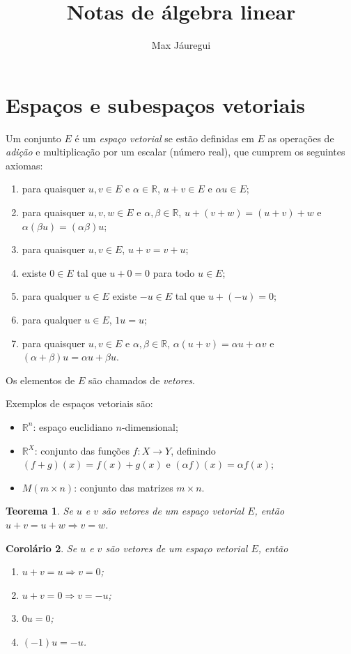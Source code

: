 \documentclass[12pt,a4paper]{article}
\title{Notas de álgebra linear}
\author{Max Jáuregui}
\newcommand{\R}{\mathbb{R}}
\newtheorem{thm}{Teorema}[section]
\newtheorem{cor}[thm]{Corolário}
\theoremstyle{definition}
\begin{document}
\maketitle

\tableofcontents

\section{Espaços e subespaços vetoriais}
Um conjunto $E$ é um \textit{espaço vetorial} se estão definidas em
$E$ as operações de \textit{adição} e multiplicação por um escalar
(número real), que cumprem os seguintes axiomas:
\begin{enumerate}
\item para quaisquer $u,v\in E$ e $\alpha\in\R$, $u+v\in E$ e
  $\alpha u\in E$;
\item para quaisquer $u,v,w\in E$ e $\alpha,\beta\in\R$,
  $u+(v+w)=(u+v)+w$ e $\alpha(\beta u)=(\alpha \beta)u$;
\item para quaisquer $u,v\in E$, $u+v=v+u$;
\item existe $0\in E$ tal que $u+0=0$ para todo $u\in E$;
\item para qualquer $u\in E$ existe $-u\in E$ tal que $u+(-u)=0$;
\item para qualquer $u\in E$, $1u=u$;
\item para quaisquer $u,v\in E$ e $\alpha,\beta\in\R$,
  $\alpha(u+v)=\alpha u+\alpha v$ e
  $(\alpha+\beta)u=\alpha u+\beta u$.
\end{enumerate}
Os elementos de $E$ são chamados de \textit{vetores}.

Exemplos de espaços vetoriais são:
\begin{itemize}
\item $\R^n$: espaço euclidiano $n$-dimensional;
\item $\R^X$: conjunto das funções $f:X\to Y$, definindo
  $(f+g)(x)=f(x)+g(x)$ e $(\alpha f)(x)=\alpha f(x)$;
\item $M(m\times n)$: conjunto das matrizes $m\times n$.
\end{itemize}

\begin{thm}
  Se $u$ e $v$ são vetores de um espaço vetorial $E$, então
  $u+v=u+w\Rightarrow v=w$.
\end{thm}
\begin{cor}
  Se $u$ e $v$ são vetores de um espaço vetorial $E$, então
  \begin{enumerate}
  \item $u+v=u\Rightarrow v=0$;
  \item $u+v=0\Rightarrow v=-u$;
  \item $0u=0$;
  \item $(-1)u=-u$.
  \end{enumerate}
\end{cor}
\end{document}
